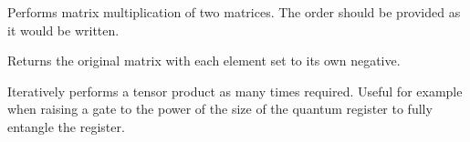 \documentclass[letterpaper,10pt,english]{sphinxmanual}
\begin{document}
\begin{fulllineitems}
\begin{fulllineitems}
\label{\detokenize{index:utils.denseMatrix.denseMatrix.multiply}}
\pysigstartsignatures
{}
\pysigstopsignatures
\sphinxAtStartPar
Performs matrix multiplication of two matrices. The order should be provided as it would
be written.

\end{fulllineitems}


\begin{fulllineitems}
\label{\detokenize{index:utils.denseMatrix.denseMatrix.negate}}
\pysigstartsignatures
{}
\pysigstopsignatures
\sphinxAtStartPar
Returns the original matrix with each element set to its own negative.

\end{fulllineitems}


\begin{fulllineitems}
\label{\detokenize{index:utils.denseMatrix.denseMatrix.power}}
\pysigstartsignatures
{}
\pysigstopsignatures
\sphinxAtStartPar
Iteratively performs a tensor product as many times required. Useful for example when raising a
gate to the power of the size of the quantum register to fully entangle the register.

\end{fulllineitems}



\end{fulllineitems}
\end{document}
